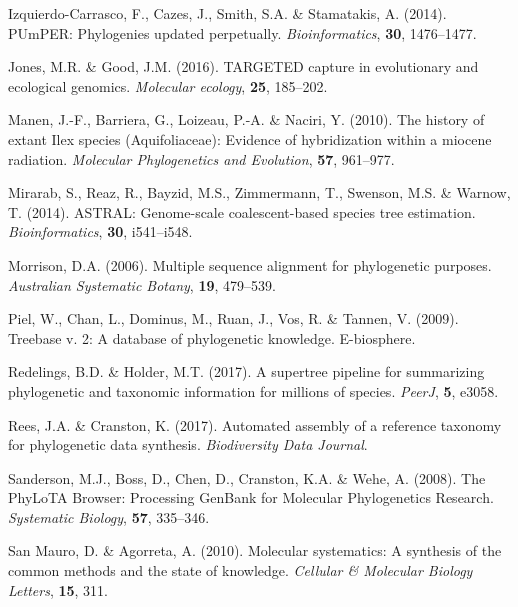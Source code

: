 \documentclass[]{article}
\begin{document}
\leavevmode\hypertarget{ref-izquierdo2014pumper}{}%
Izquierdo-Carrasco, F., Cazes, J., Smith, S.A. \& Stamatakis, A. (2014). PUmPER: Phylogenies updated perpetually. \emph{Bioinformatics}, \textbf{30}, 1476--1477.

\leavevmode\hypertarget{ref-jones2016targeted}{}%
Jones, M.R. \& Good, J.M. (2016). TARGETED capture in evolutionary and ecological genomics. \emph{Molecular ecology}, \textbf{25}, 185--202.

\leavevmode\hypertarget{ref-manen2010history}{}%
Manen, J.-F., Barriera, G., Loizeau, P.-A. \& Naciri, Y. (2010). The history of extant Ilex species (Aquifoliaceae): Evidence of hybridization within a miocene radiation. \emph{Molecular Phylogenetics and Evolution}, \textbf{57}, 961--977.

\leavevmode\hypertarget{ref-mirarab2014astral}{}%
Mirarab, S., Reaz, R., Bayzid, M.S., Zimmermann, T., Swenson, M.S. \& Warnow, T. (2014). ASTRAL: Genome-scale coalescent-based species tree estimation. \emph{Bioinformatics}, \textbf{30}, i541--i548.

\leavevmode\hypertarget{ref-morrison2006multiple}{}%
Morrison, D.A. (2006). Multiple sequence alignment for phylogenetic purposes. \emph{Australian Systematic Botany}, \textbf{19}, 479--539.

\leavevmode\hypertarget{ref-piel2009treebase}{}%
Piel, W., Chan, L., Dominus, M., Ruan, J., Vos, R. \& Tannen, V. (2009). Treebase v. 2: A database of phylogenetic knowledge. E-biosphere.

\leavevmode\hypertarget{ref-redelings2017supertree}{}%
Redelings, B.D. \& Holder, M.T. (2017). A supertree pipeline for summarizing phylogenetic and taxonomic information for millions of species. \emph{PeerJ}, \textbf{5}, e3058.

\leavevmode\hypertarget{ref-rees2017automated}{}%
Rees, J.A. \& Cranston, K. (2017). Automated assembly of a reference taxonomy for phylogenetic data synthesis. \emph{Biodiversity Data Journal}.

\leavevmode\hypertarget{ref-sanderson2008phylota}{}%
Sanderson, M.J., Boss, D., Chen, D., Cranston, K.A. \& Wehe, A. (2008). The PhyLoTA Browser: Processing GenBank for Molecular Phylogenetics Research. \emph{Systematic Biology}, \textbf{57}, 335--346.

\leavevmode\hypertarget{ref-san2010molecular}{}%
San Mauro, D. \& Agorreta, A. (2010). Molecular systematics: A synthesis of the common methods and the state of knowledge. \emph{Cellular \& Molecular Biology Letters}, \textbf{15}, 311.
\end{document}
